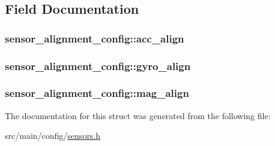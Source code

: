 \subsection{Field Documentation}
\hypertarget{structsensor__alignment__config_a884336b1d398c12315581aa76aa1809d}{
\subsubsection[{acc\+\_\+align}]{ sensor\+\_\+alignment\+\_\+config\+::acc\+\_\+align}}\label{structsensor__alignment__config_a884336b1d398c12315581aa76aa1809d}
\hypertarget{structsensor__alignment__config_a248b35033439d260cd4288c6c197bcfa}{
\subsubsection[{gyro\+\_\+align}]{ sensor\+\_\+alignment\+\_\+config\+::gyro\+\_\+align}}\label{structsensor__alignment__config_a248b35033439d260cd4288c6c197bcfa}
\hypertarget{structsensor__alignment__config_a8226a01023de52da27af489e17a314b2}{
\subsubsection[{mag\+\_\+align}]{ sensor\+\_\+alignment\+\_\+config\+::mag\+\_\+align}}\label{structsensor__alignment__config_a8226a01023de52da27af489e17a314b2}


The documentation for this struct was generated from the following file\+:\begin{DoxyCompactItemize}
\item 
src/main/config/\hyperlink{sensors_8h}{sensors.\+h}\end{DoxyCompactItemize}
